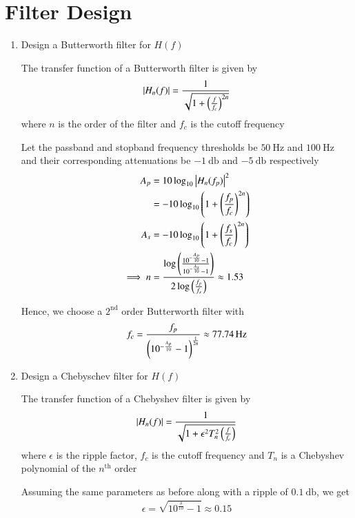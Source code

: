 \documentclass[journal,12pt,twocolumn]{IEEEtran}
\renewcommand\thesection{\arabic{section}}
\begin{document}
\section{Filter Design}

\begin{enumerate}[label=\thesection.\arabic*, ref=\thesection.\theenumi]

\item Design a Butterworth filter for $H(f)$

	\solution The transfer function of a Butterworth filter is given by
	\begin{align}
		\left\vert H_n(f)\right\vert = \frac{1}{\sqrt{1+\left(\frac{f}{f_c}\right)^{2n}}}
	\end{align}
	where $n$ is the order of the filter and $f_c$ is the cutoff frequency

	Let the passband and stopband frequency thresholds be $\SI{50}{\hertz}$ and $\SI{100}{\hertz}$ and their corresponding attenuations be $-\SI{1}{\decibel}$ and $-\SI{5}{\decibel}$ respectively
	\begin{align}
		A_p &= 10 \log_{10}\left\vert H_n(f_p)\right\vert^2 \\
		&= -10\log_{10}\left(1+\left(\frac{f_p}{f_c}\right)^{2n}\right) \\
		A_s &= -10\log_{10}\left(1+\left(\frac{f_s}{f_c}\right)^{2n}\right) \\
		\implies n &=\frac{\log\left(\frac{10^{-\frac{A_p}{10}}-1}{ 10^{-\frac{A_s}{10}}-1}\right)}{2 \log \left(\frac{f_p}{f_s}\right)} \approx 1.53
	\end{align}

	Hence, we choose a $2^{\mathrm{nd}}$ order Butterworth filter with
	\begin{align}
		f_c = \frac{f_p}{\left(10^{-\frac{A_p}{10}}-1\right)^{\frac{1}{2n}}} \approx \SI{77.74}{\hertz}
	\end{align}

\item Design a Chebyschev filter for $H(f)$

	\solution The transfer function of a Chebyshev filter is given by
	\begin{align}
		\left\vert H_n(f)\right\vert =\frac{1}{\sqrt{1+\epsilon^{2}T_{n}^2\left(\frac{f}{f_c}\right)}}
	\end{align}
	where $\epsilon$ is the ripple factor, $f_c$ is the cutoff frequency and $T_n$ is a Chebyshev polynomial of the $n^{\mathrm{th}}$ order

	Assuming the same parameters as before along with a ripple of $\SI{0.1}{\decibel}$, we get
	\begin{align}
		\epsilon = \sqrt{10^{\frac{\delta}{10}} - 1} \approx 0.15
	\end{align}


\end{enumerate}
\end{document}
